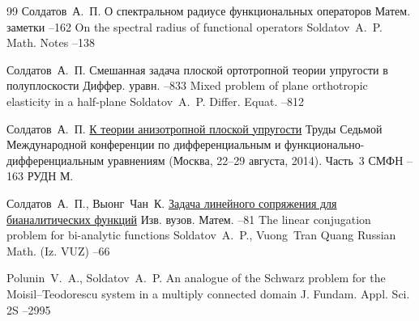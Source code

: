 \begin{thebibliography}{99}
\by Солдатов~А.~П.
\paper О спектральном радиусе функциональных операторов
\jour Матем. заметки
--162
\transl
\paper On the spectral radius of functional operators
\by Soldatov~A.~P.
\jour Math. Notes
--138

\by Солдатов~А.~П.
\paper Смешанная задача плоской ортотропной теории упругости в полуплоскости
\jour Диффер. уравн.
--833
\transl
\paper Mixed problem of plane orthotropic elasticity in a half-plane
\by Soldatov~A.~P.
\jour Differ. Equat.
--812


\by Солдатов~А.~П.
\paper \href{http://mi.mathnet.ru/cmfd298}{К теории анизотропной плоской упругости}
\inbook Труды Седьмой Международной конференции по дифференциальным и функционально-дифференциальным уравнениям \rm (Москва, 22--29 августа, 2014). Часть~3
\serial СМФН
--163
\publ РУДН
\publaddr М.



\by Солдатов~А.~П., Выонг~Чан~К.
\paper \href{http://mi.mathnet.ru/ivm9188}{Задача линейного сопряжения для бианалитических функций}
\jour Изв. вузов. Матем.
--81
\transl 
\paper The linear conjugation problem for bi-analytic functions
\by  Soldatov~A.~P., Vuong~Tran Quang
\jour Russian Math. (Iz. VUZ)
--66


\by Polunin~V.~A., Soldatov~A.~P.
\paper An analogue of the Schwarz problem for the Moisil--Teodorescu system in a multiply connected domain
\jour J. Fundam. Appl. Sci.
\issue 2S
--2995


\end{thebibliography}
